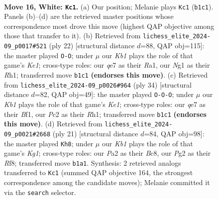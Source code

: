 \documentclass[11pt]{article}
\begin{document}
\clearpage

\begin{figure}[p]\centering
\begin{subfigure}{0.46\textwidth}\centering
\resizebox{\linewidth}{!}{%
\newchessgame
\chessboard[
  setfen={rnb1r3/p2nq1kp/1pp1p1p1/3pP3/8/2N5/PPPQ1PPP/1K2RBNR w - - 2 16},
  showmover=false,
  pgfstyle=straightmove, color=movearrow, markmove={b1-c1}
]}
\caption{}
\end{subfigure}\hfill
\begin{subfigure}{0.46\textwidth}\centering
\resizebox{\linewidth}{!}{%
\newchessgame
\chessboard[
  setfen={rn2k1nr/p3q1bp/1pp2pp1/4p3/P1N1P3/1QP2N2/1P3PPP/R1B1K2R w KQkq - 0 12},
  showmover=false,
  pgfstyle=straightmove, color=movearrow, markmove={e1-g1}
]}
\caption{}
\end{subfigure}
\\[4pt]
\begin{subfigure}{0.46\textwidth}\centering
\resizebox{\linewidth}{!}{%
\newchessgame
\chessboard[
  setfen={r1bqk2r/ppp2p2/3pn2p/8/4PPnP/2N3pN/PPPQ2P1/R3KB1R w KQkq - 0 18},
  showmover=false,
  pgfstyle=straightmove, color=movearrow, markmove={e1-c1}
]}
\caption{}
\end{subfigure}\hfill
\begin{subfigure}{0.46\textwidth}\centering
\resizebox{\linewidth}{!}{%
\newchessgame
\chessboard[
  setfen={r1b2rk1/pp1ppp1p/1qn4b/8/3PP2p/1PPQ1N2/P5PP/RN2KB1R b KQ - 2 11},
  showmover=false,
  pgfstyle=straightmove, color=movearrow, markmove={g8-h8}
]}
\caption{}
\end{subfigure}
\caption{\textbf{Move 16, White: \texttt{Kc1}.} (a) Our position; Melanie plays \texttt{Kc1} (\texttt{b1c1}). Panels (b)--(d) are the retrieved master positions whose correspondence most drove this move (highest QAP objective among those that transfer to it). (b) Retrieved from \texttt{lichess\_elite\_2024-09\_p0017\#521} (ply 22) [structural distance $d$=88, QAP obj=115]: the master played \texttt{O-O}; under $\mu$ our \emph{Kb1} plays the role of that game's \emph{Ke1}; cross-type roles: our \emph{q}e7 as their \emph{R}a1, our \emph{N}g1 as their \emph{R}h1; transferred move \texttt{b1c1} \textbf{(endorses this move)}. (c) Retrieved from \texttt{lichess\_elite\_2024-09\_p0026\#964} (ply 34) [structural distance $d$=82, QAP obj=49]: the master played \texttt{O-O-O}; under $\mu$ our \emph{Kb1} plays the role of that game's \emph{Ke1}; cross-type roles: our \emph{q}e7 as their \emph{B}f1, our \emph{P}c2 as their \emph{R}h1; transferred move \texttt{b1c1} \textbf{(endorses this move)}. (d) Retrieved from \texttt{lichess\_elite\_2024-09\_p0021\#2668} (ply 21) [structural distance $d$=84, QAP obj=98]: the master played \texttt{Kh8}; under $\mu$ our \emph{Kb1} plays the role of that game's \emph{Kg1}; cross-type roles: our \emph{P}a2 as their \emph{B}c8, our \emph{P}g2 as their \emph{R}f8; transferred move \texttt{b1a1}. Synthesis: 2 retrieved analogs transferred to \texttt{Kc1} (summed QAP objective 164, the strongest correspondence among the candidate moves); Melanie committed it via the \texttt{search} selector.}
\label{fig:thought-m30}
\end{figure}
\end{document}
